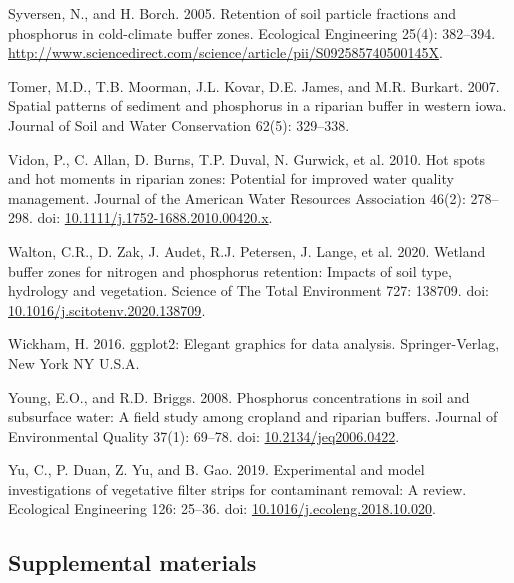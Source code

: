\documentclass[
]{agujournal2019}
\newlength{\cslhangindent}
\newenvironment{CSLReferences}[2] %
 {\begin{list}{}{%
  \setlength{\itemindent}{0pt}
  \setlength{\leftmargin}{0pt}
  \setlength{\parsep}{0pt}
  \ifodd #1
   \setlength{\leftmargin}{\cslhangindent}
   \setlength{\itemindent}{-1\cslhangindent}
  \fi
  \setlength{\itemsep}{#2\baselineskip}}}
 {\end{list}}
\begin{document}
\begin{CSLReferences}{1}{1}
Syversen, N., and H. Borch. 2005. Retention of soil particle fractions
and phosphorus in cold-climate buffer zones. Ecological Engineering
25(4): 382--394.
\url{http://www.sciencedirect.com/science/article/pii/S092585740500145X}.

Tomer, M.D., T.B. Moorman, J.L. Kovar, D.E. James, and M.R. Burkart.
2007. Spatial patterns of sediment and phosphorus in a riparian buffer
in western iowa. Journal of Soil and Water Conservation 62(5): 329--338.

Vidon, P., C. Allan, D. Burns, T.P. Duval, N. Gurwick, et al. 2010. Hot
spots and hot moments in riparian zones: Potential for improved water
quality management. Journal of the American Water Resources Association
46(2): 278--298. doi:
\href{https://doi.org/10.1111/j.1752-1688.2010.00420.x}{10.1111/j.1752-1688.2010.00420.x}.

Walton, C.R., D. Zak, J. Audet, R.J. Petersen, J. Lange, et al. 2020.
Wetland buffer zones for nitrogen and phosphorus retention: Impacts of
soil type, hydrology and vegetation. Science of The Total Environment
727: 138709. doi:
\href{https://doi.org/10.1016/j.scitotenv.2020.138709}{10.1016/j.scitotenv.2020.138709}.

Wickham, H. 2016. ggplot2: Elegant graphics for data analysis.
Springer-Verlag, New York NY U.S.A.

Young, E.O., and R.D. Briggs. 2008. Phosphorus concentrations in soil
and subsurface water: A field study among cropland and riparian buffers.
Journal of Environmental Quality 37(1): 69--78. doi:
\href{https://doi.org/10.2134/jeq2006.0422}{10.2134/jeq2006.0422}.

Yu, C., P. Duan, Z. Yu, and B. Gao. 2019. Experimental and model
investigations of vegetative filter strips for contaminant removal: A
review. Ecological Engineering 126: 25--36. doi:
\href{https://doi.org/10.1016/j.ecoleng.2018.10.020}{10.1016/j.ecoleng.2018.10.020}.

\end{CSLReferences}

\subsection*{Supplemental materials}\label{supplemental-materials}
\end{document}
